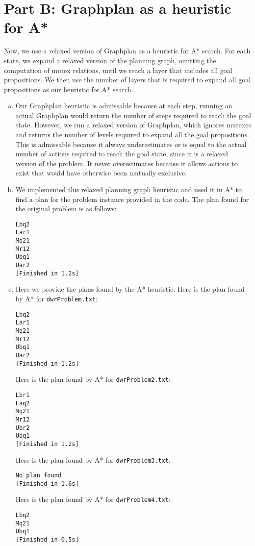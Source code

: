 \documentclass[12pt]{article}
\begin{document}
\section{Part B: Graphplan as a heuristic for A*}
Now, we use a relaxed version of Graphplan as a heuristic for A* search. For each state, we expand a relaxed version of the planning graph, omitting the computation of mutex relations, until we reach a layer that includes all goal propositions. We then use the number of layers that is required to expand all goal propositions as our heuristic for A* search.

\begin{enumerate}[(a)]
\item Our Graphplan heuristic is admissable because at each step, running an actual Graphplan would return the number of steps required to reach the goal state. However, we run a relaxed version of Graphplan, which ignores mutexes and returns the number of levels required to expand all the goal propositions. This is admissable because it always underestimates or is equal to the actual number of actions required to reach the goal state, since it is a relaxed version of the problem. It never overestimates because it allows actions to exist that would have otherwise been mutually exclusive.

\item We implemented this relaxed planning graph heuristic and used it in A* to find a plan for the problem instance provided in the code. The plan found for the original problem is as follows:

\begin{verbatim}
Lbq2
Lar1
Mq21
Mr12
Ubq1
Uar2
[Finished in 1.2s]
\end{verbatim}

\item Here we provide the plans found by the A* heuristic:
Here is the plan found by A* for \verb|dwrProblem.txt|:
\begin{verbatim}
Lbq2
Lar1
Mq21
Mr12
Ubq1
Uar2
[Finished in 1.2s]
\end{verbatim}

Here is the plan found by A* for \verb|dwrProblem2.txt|:
\begin{verbatim}
Lbr1
Laq2
Mq21
Mr12
Ubr2
Uaq1
[Finished in 1.2s]
\end{verbatim}

Here is the plan found by A* for \verb|dwrProblem3.txt|:
\begin{verbatim}
No plan found
[Finished in 1.6s]
\end{verbatim}

Here is the plan found by A* for \verb|dwrProblem4.txt|:
\begin{verbatim}
Lbq2
Mq21
Ubq1
[Finished in 0.5s]
\end{verbatim}

\end{enumerate}
\end{document}
